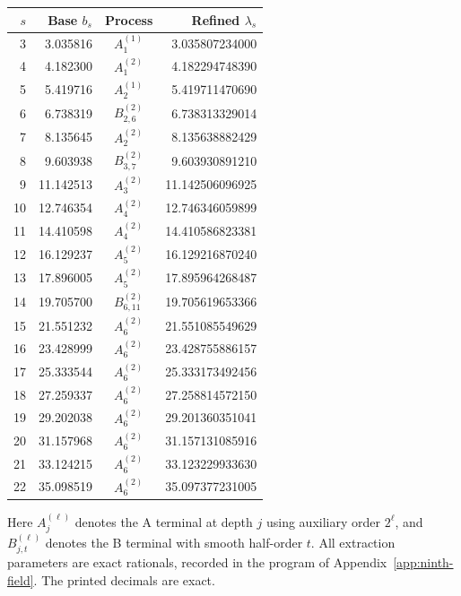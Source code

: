 \documentclass[11pt]{amsart}
\theoremstyle{definition}
\numberwithin{equation}{section}
\begin{document}
\begin{center}
\begin{tabular}{@{}r r c r@{}}
\hline
$s$&Base $b_s$&Process&Refined $\lambda_s$\\
\hline
3&3.035816&$A_{1}^{(1)}$&3.035807234000\\
4&4.182300&$A_{1}^{(2)}$&4.182294748390\\
5&5.419716&$A_{2}^{(1)}$&5.419711470690\\
6&6.738319&$B_{2,6}^{(2)}$&6.738313329014\\
7&8.135645&$A_{2}^{(2)}$&8.135638882429\\
8&9.603938&$B_{3,7}^{(2)}$&9.603930891210\\
9&11.142513&$A_{3}^{(2)}$&11.142506096925\\
10&12.746354&$A_{4}^{(2)}$&12.746346059899\\
11&14.410598&$A_{4}^{(2)}$&14.410586823381\\
12&16.129237&$A_{5}^{(2)}$&16.129216870240\\
13&17.896005&$A_{5}^{(2)}$&17.895964268487\\
14&19.705700&$B_{6,11}^{(2)}$&19.705619653366\\
15&21.551232&$A_{6}^{(2)}$&21.551085549629\\
16&23.428999&$A_{6}^{(2)}$&23.428755886157\\
17&25.333544&$A_{6}^{(2)}$&25.333173492456\\
18&27.259337&$A_{6}^{(2)}$&27.258814572150\\
19&29.202038&$A_{6}^{(2)}$&29.201360351041\\
20&31.157968&$A_{6}^{(2)}$&31.157131085916\\
21&33.124215&$A_{6}^{(2)}$&33.123229933630\\
22&35.098519&$A_{6}^{(2)}$&35.097377231005\\
\hline
\end{tabular}
\end{center}
Here $A_j^{(\ell)}$ denotes the A terminal at depth $j$ using auxiliary
order $2^\ell$, and $B_{j,t}^{(\ell)}$ denotes the B terminal with smooth
half-order $t$.  All extraction parameters are exact rationals, recorded
in the program of Appendix~\ref{app:ninth-field}.  The printed decimals are exact.
\end{document}
